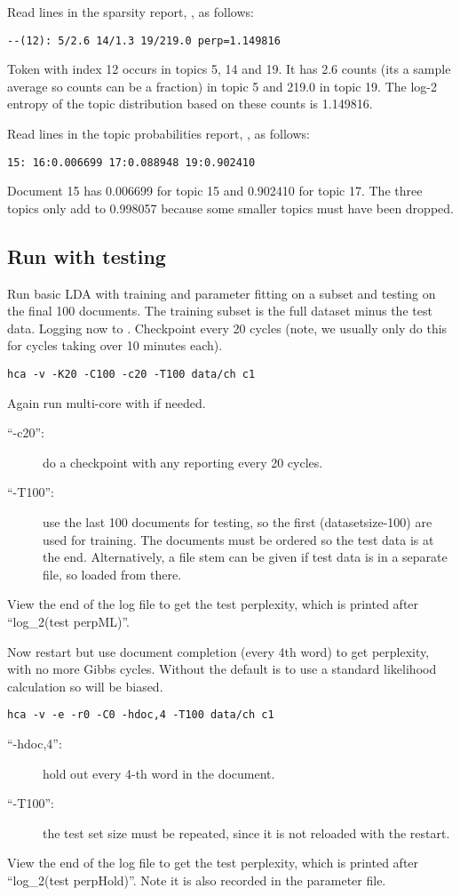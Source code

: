 \documentclass[a4paper,english]{article}
\begin{document}
Read lines in the sparsity report, , as follows:
\begin{verbatim}
--(12): 5/2.6 14/1.3 19/219.0 perp=1.149816
\end{verbatim} 
Token with index 12 occurs in topics 5, 14 and 19.
It has 2.6 counts (its a sample average so counts can be a fraction)
in topic 5 and 219.0 in topic 19.
The log-2 entropy of the topic distribution based on these
counts is 1.149816.

Read lines in the topic probabilities report, , as follows:
\begin{verbatim}
15: 16:0.006699 17:0.088948 19:0.902410
\end{verbatim} 
Document 15 has 0.006699 for topic 15 and 0.902410 for topic 17.
The three topics only add to 0.998057 because some
smaller topics must have been dropped.

\subsection{Run with testing}

Run basic LDA with training and parameter fitting on a subset
and testing on the final 100 documents.  
The training subset is the full dataset minus the test data.
Logging now to .
Checkpoint every 20 cycles
(note, we usually only do this for cycles taking over 10 minutes each).
\begin{verbatim}
hca -v -K20 -C100 -c20 -T100 data/ch c1
\end{verbatim}
Again run multi-core with  if needed.
\begin{description}
\item[``-c20'':] do a checkpoint with any reporting every
20 cycles.
\item[``-T100'':] use the last 100 documents for testing,
so the first (datasetsize-100) are used for training.
The documents must be ordered so the test data is at the end.
Alternatively, a file stem can be given if test data is in a 
separate file, so loaded from there.
\end{description}
View the end of the log file to get the test perplexity,
which is printed after ``log\_2(test perpML)''.

Now restart but use document completion (every 4th word) to 
get perplexity, with no more Gibbs cycles.
Without  the default is to use
a standard likelihood calculation so will be biased.
\begin{verbatim}
hca -v -e -r0 -C0 -hdoc,4 -T100 data/ch c1
\end{verbatim}
\begin{description}
\item[``-hdoc,4'':] hold out every 4-th word in
the document.
\item[``-T100'':] the test set size must be repeated, since it is not
reloaded with the restart.
\end{description}
View the end of the log file to get the test perplexity,
which is printed after ``log\_2(test perpHold)''.
Note it is also recorded in the parameter file.
\end{document}
